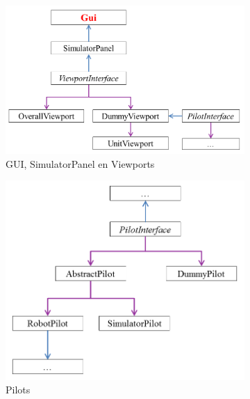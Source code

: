 \documentclass[tt1]{penoverslag}
\begin{document}
\begin{landscape}
\begin{figure}
\centering
	\begin{subfigure}{0.60\textwidth}
	\centering
		\includegraphics[width=\textwidth]{KlasGUI}
		\caption{GUI, SimulatorPanel en Viewports}
	\end{subfigure}%
	\begin{subfigure}{0.5\textwidth}
		\centering
		\includegraphics[width=\textwidth]{KlasPilot}
	\caption{Pilots}
\end{subfigure}%
\begin{subfigure}{0.45\textwidth}
		\centering

\end{subfigure}
\end{figure}
\end{landscape}
\end{document}
